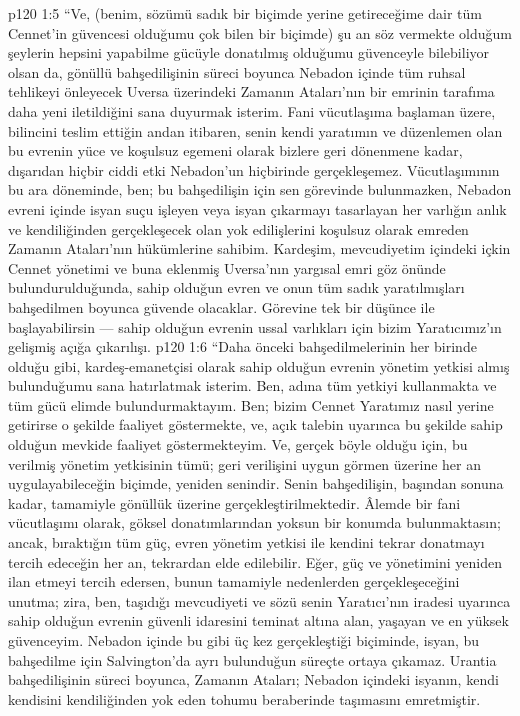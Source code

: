 \vs p120 1:5 “Ve, (benim, sözümü sadık bir biçimde yerine getireceğime dair tüm Cennet’in güvencesi olduğumu çok bilen bir biçimde) şu an söz vermekte olduğum şeylerin hepsini yapabilme gücüyle donatılmış olduğumu güvenceyle bilebiliyor olsan da, gönüllü bahşedilişinin süreci boyunca Nebadon içinde tüm ruhsal tehlikeyi önleyecek Uversa üzerindeki Zamanın Ataları’nın bir emrinin tarafıma daha yeni iletildiğini sana duyurmak isterim. Fani vücutlaşıma başlaman üzere, bilincini teslim ettiğin andan itibaren, senin kendi yaratımın ve düzenlemen olan bu evrenin yüce ve koşulsuz egemeni olarak bizlere geri dönenmene kadar, dışarıdan hiçbir ciddi etki Nebadon’un hiçbirinde gerçekleşemez. Vücutlaşımının bu ara döneminde, ben; bu bahşedilişin için sen görevinde bulunmazken, Nebadon evreni içinde isyan suçu işleyen veya isyan çıkarmayı tasarlayan her varlığın anlık ve kendiliğinden gerçekleşecek olan yok edilişlerini koşulsuz olarak emreden Zamanın Ataları’nın hükümlerine sahibim. Kardeşim, mevcudiyetim içindeki içkin Cennet yönetimi ve buna eklenmiş Uversa’nın yargısal emri göz önünde bulundurulduğunda, sahip olduğun evren ve onun tüm sadık yaratılmışları bahşedilmen boyunca güvende olacaklar. Görevine tek bir düşünce ile başlayabilirsin --- sahip olduğun evrenin ussal varlıkları için bizim Yaratıcımız’ın gelişmiş açığa çıkarılışı.
\vs p120 1:6 “Daha önceki bahşedilmelerinin her birinde olduğu gibi, kardeş\hyp{}emanetçisi olarak sahip olduğun evrenin yönetim yetkisi almış bulunduğumu sana hatırlatmak isterim. Ben, adına tüm yetkiyi kullanmakta ve tüm gücü elimde bulundurmaktayım. Ben; bizim Cennet Yaratımız nasıl yerine getirirse o şekilde faaliyet göstermekte, ve, açık talebin uyarınca bu şekilde sahip olduğun mevkide faaliyet göstermekteyim. Ve, gerçek böyle olduğu için, bu verilmiş yönetim yetkisinin tümü; geri verilişini uygun görmen üzerine her an uygulayabileceğin biçimde, yeniden senindir. Senin bahşedilişin, başından sonuna kadar, tamamiyle gönüllük üzerine gerçekleştirilmektedir. Âlemde bir fani vücutlaşımı olarak, göksel donatımlarından yoksun bir konumda bulunmaktasın; ancak, bıraktığın tüm güç, evren yönetim yetkisi ile kendini tekrar donatmayı tercih edeceğin her an, tekrardan elde edilebilir. Eğer, güç ve yönetimini yeniden ilan etmeyi tercih edersen, bunun tamamiyle  nedenlerden gerçekleşeceğini unutma; zira, ben, taşıdığı mevcudiyeti ve sözü senin Yaratıcı’nın iradesi uyarınca sahip olduğun evrenin güvenli idaresini teminat altına alan, yaşayan ve en yüksek güvenceyim. Nebadon içinde bu gibi üç kez gerçekleştiği biçiminde, isyan, bu bahşedilme için Salvington’da ayrı bulunduğun süreçte ortaya çıkamaz. Urantia bahşedilişinin süreci boyunca, Zamanın Ataları; Nebadon içindeki isyanın, kendi kendisini kendiliğinden yok eden tohumu beraberinde taşımasını emretmiştir.

